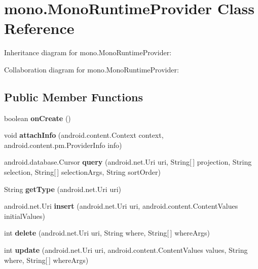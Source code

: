 \hypertarget{classmono_1_1_mono_runtime_provider}{}\section{mono.\+Mono\+Runtime\+Provider Class Reference}
\label{classmono_1_1_mono_runtime_provider}


Inheritance diagram for mono.\+Mono\+Runtime\+Provider\+:


Collaboration diagram for mono.\+Mono\+Runtime\+Provider\+:
\subsection*{Public Member Functions}
\begin{DoxyCompactItemize}
\item 
\mbox{\label{classmono_1_1_mono_runtime_provider_ac5640d3ce8472accc1953fe591e683c3}} 
boolean {\bfseries on\+Create} ()
\item 
\mbox{\label{classmono_1_1_mono_runtime_provider_a4fb9f5a38268fb642d211e7ef0fd9228}} 
void {\bfseries attach\+Info} (android.\+content.\+Context context, android.\+content.\+pm.\+Provider\+Info info)
\item 
\mbox{\label{classmono_1_1_mono_runtime_provider_a5f038667e16324d54f940968f4abd86f}} 
android.\+database.\+Cursor {\bfseries query} (android.\+net.\+Uri uri, String\mbox{[}$\,$\mbox{]} projection, String selection, String\mbox{[}$\,$\mbox{]} selection\+Args, String sort\+Order)
\item 
\mbox{\label{classmono_1_1_mono_runtime_provider_ab7978ccd79378f86aabc9a1997bff129}} 
String {\bfseries get\+Type} (android.\+net.\+Uri uri)
\item 
\mbox{\label{classmono_1_1_mono_runtime_provider_afbf0b2575d76132ac379064f3f695013}} 
android.\+net.\+Uri {\bfseries insert} (android.\+net.\+Uri uri, android.\+content.\+Content\+Values initial\+Values)
\item 
\mbox{\label{classmono_1_1_mono_runtime_provider_a20fd29ee82e2fbc6ca8e3a7d53e89b9f}} 
int {\bfseries delete} (android.\+net.\+Uri uri, String where, String\mbox{[}$\,$\mbox{]} where\+Args)
\item 
\mbox{\label{classmono_1_1_mono_runtime_provider_a70342b01de97d26ab215db961f4a714c}} 
int {\bfseries update} (android.\+net.\+Uri uri, android.\+content.\+Content\+Values values, String where, String\mbox{[}$\,$\mbox{]} where\+Args)
\end{DoxyCompactItemize}


